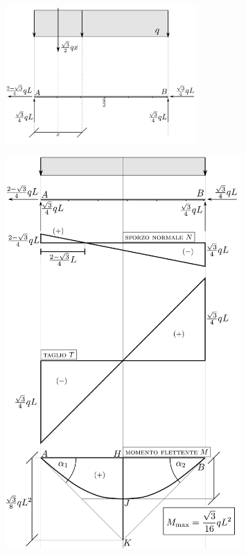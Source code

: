\renewcommand{\thefigure}{12.1~-~3}
\begin{figure}[ht]
\centering
\includegraphics[width=0.65\textwidth]{Immagini/Parte_12/Esercizio12_1_1/esercizio12_1_3.pdf}
\caption{}
\label{Esercizio12-1-3}
\end{figure}
\renewcommand{\thefigure}{12.1~-~4}
\begin{figure}[ht]
\centering
\includegraphics[width=0.8\textwidth]{Immagini/Parte_12/Esercizio12_1_1/esercizio12_1_4.pdf}
\caption{}
\label{Esercizio12-1-4}
\end{figure}
